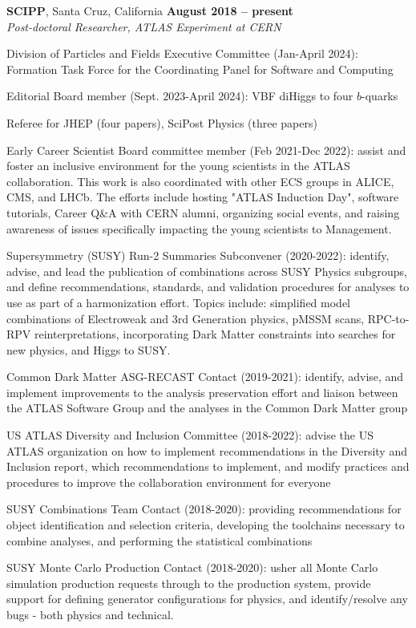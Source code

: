 \documentclass[margin,line]{resume}
\begin{document}
\begin{resume}
\textbf{SCIPP}, Santa Cruz, California \hfill \textbf{August 2018 -- present}\\
\textsl{Post-doctoral Researcher, ATLAS Experiment at CERN}
\begin{list2}
  \item Division of Particles and Fields Executive Committee (Jan-April 2024): Formation Task Force for the Coordinating Panel for Software and Computing
  \item Editorial Board member (Sept. 2023-April 2024): VBF diHiggs to four $b$-quarks
  \item Referee for JHEP (four papers), SciPost Physics (three papers)
  \item Early Career Scientist Board committee member (Feb 2021-Dec 2022): assist and foster an inclusive environment for the young scientists in the ATLAS collaboration. This work is also coordinated with other ECS groups in ALICE, CMS, and LHCb. The efforts include hosting "ATLAS Induction Day", software tutorials, Career Q\&A with CERN alumni, organizing social events, and raising awareness of issues specifically impacting the young scientists to Management.
  \item Supersymmetry (SUSY) Run-2 Summaries Subconvener (2020-2022): identify, advise, and lead the publication of combinations across SUSY Physics subgroups, and define recommendations, standards, and validation procedures for analyses to use as part of a harmonization effort. Topics include: simplified model combinations of Electroweak and 3rd Generation physics, pMSSM scans, RPC-to-RPV reinterpretations, incorporating Dark Matter constraints into searches for new physics, and Higgs to SUSY.
  \item Common Dark Matter ASG-RECAST Contact (2019-2021): identify, advise, and implement improvements to the analysis preservation effort and liaison between the ATLAS Software Group and the analyses in the Common Dark Matter group
  \item US ATLAS Diversity and Inclusion Committee (2018-2022): advise the US ATLAS organization on how to implement recommendations in the Diversity and Inclusion report, which recommendations to implement, and modify practices and procedures to improve the collaboration environment for everyone
  \item SUSY Combinations Team Contact (2018-2020): providing recommendations for object identification and selection criteria, developing the toolchains necessary to combine analyses, and performing the statistical combinations
  \item SUSY Monte Carlo Production Contact (2018-2020): usher all Monte Carlo simulation production requests through to the production system, provide support for defining generator configurations for physics, and identify/resolve any bugs - both physics and technical.

\end{list2}
\end{resume}
\end{document}
